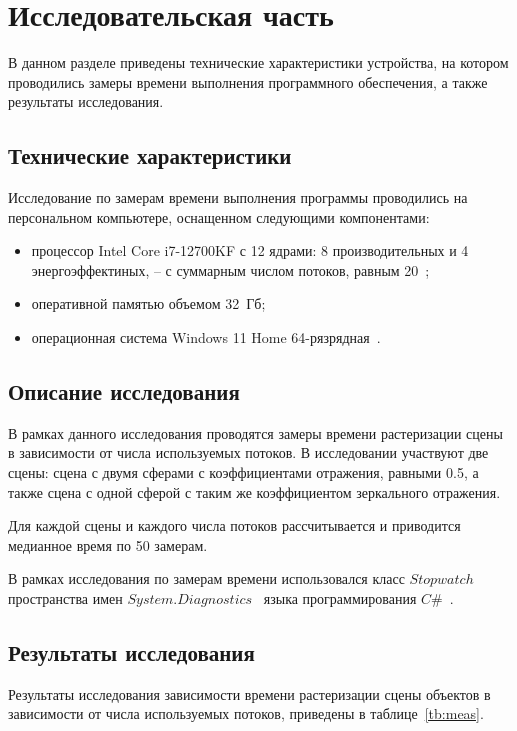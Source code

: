 \chapter{Исследовательская часть}

В данном разделе приведены технические характеристики устройства, на котором проводились замеры времени выполнения программного обеспечения, а также результаты исследования.

\section{Технические характеристики}
Исследование по замерам времени выполнения программы проводились на персональном компьютере, оснащенном следующими компонентами:
\begin{itemize}
	\item процессор Intel Core i7-12700KF с 12 ядрами: 8 производительных и 4 энергоэффектиных, -- с суммарным числом потоков, равным 20~\cite{proc};
	\item оперативной памятью объемом 32~Гб;
	\item операционная система Windows 11 Home 64-рязрядная~\cite{win11}.
	\end{itemize}
	
\section{Описание исследования}
В рамках данного исследования проводятся замеры времени растеризации сцены в зависимости от числа используемых потоков. В исследовании участвуют две сцены: сцена с двумя сферами с коэффициентами отражения, равными 0.5, а также сцена с одной сферой с таким же коэффициентом зеркального отражения.

Для каждой сцены и каждого числа потоков рассчитывается и приводится медианное время по 50 замерам.

В рамках исследования по замерам времени использовался класс $Stopwatch$~\cite{Stopwatch} пространства имен $System.Diagnostics$~\cite{System.Diagnostics} языка программирования $C\#$~\cite{CSharp}.

\section{Результаты исследования}
Результаты исследования зависимости времени растеризации сцены объектов в зависимости от числа используемых потоков, приведены в таблице~\ref{tb:meas}.

